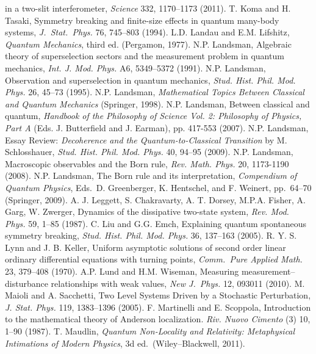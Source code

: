 \documentclass[12pt]{article}
\begin{document}
\begin{thebibliography}{99}
\begin{footnotesize}
in a two-slit interferometer, \emph{Science} 332, 1170--1173 (2011). 
 T. Koma and H. Tasaki, Symmetry breaking and finite-size effects in quantum many-body systems,  \emph{J.\ Stat.\ Phys.}  76, 745--803 (1994).
 L.D. Landau and E.M. Lifshitz, {\it Quantum Mechanics}, third ed. (Pergamon, 1977). 
 N.P. Landsman,
Algebraic
theory of superselection sectors and the measurement problem in
quantum mechanics, \emph{ Int. J. Mod. Phys.}
A6, 5349--5372 (1991). 
  N.P. Landsman,
  Observation and superselection in quantum mechanics, \emph{Stud. Hist. Phil. Mod. Phys.} 26, 45--73 (1995).
 N.P. Landsman, {\it Mathematical Topics Between Classical and Quantum Mechanics} (Springer, 1998).        
 N.P. Landsman,  Between classical and quantum, {\it Handbook of the Philosophy of Science Vol. 2: Philosophy of Physics, Part A} (Eds. J. Butterfield and J. Earman),  pp. 417-553 (2007).
  N.P. Landsman, Essay Review: \emph{Decoherence and the Quantum-to-Classical Transition} by M. Schlosshauer,
\emph{ Stud. Hist. Phil. Mod. Phys.} 40, 94--95 (2009).
   N.P. Landsman, Macroscopic observables and the Born rule, \emph{Rev. Math. Phys.} 20, 1173-1190 (2008).
     N.P. Landsman, The Born rule and its interpretation,   {\it Compendium of Quantum Physics},  Eds.\ D. Greenberger, K. Hentschel, and F. Weinert, pp.\ 64--70 (Springer, 2009).
  A. J. Leggett, S. Chakravarty, A. T. Dorsey, M.P.A. Fisher, A. Garg, W. Zwerger, Dynamics of the dissipative two-state system,
 \emph{Rev. Mod. Phys.}  59, 1--85 (1987). 
  C. Liu and G.G. Emch, Explaining quantum spontaneous symmetry breaking,
  \emph{Stud. Hist. Phil. Mod. Phys.} 36, 137--163  (2005).
    R. Y. S. Lynn and J. B. Keller, Uniform asymptotic solutions of second order linear ordinary differential equations with turning points, \emph{Comm.\ Pure Applied Math.} 23, 379--408 (1970).
    A.P. Lund and H.M. Wiseman, Measuring measurement--disturbance relationships with weak values,  \emph{New J.\ Phys.} 12, 093011
   (2010). 
 M. Maioli and A. Sacchetti, Two Level Systems Driven by a Stochastic Perturbation,
\emph{J. Stat. Phys.}  119, 1383--1396  (2005).
  F. Martinelli and E. Scoppola, Introduction to the mathematical theory of Anderson localization.
 \emph{Riv. Nuovo Cimento} (3) 10, 1--90 (1987).
 	 T. Maudlin, \emph{Quantum Non-Locality and Relativity: Metaphysical Intimations of Modern Physics}, 3d ed.\ (Wiley--Blackwell, 2011).

\end{footnotesize}
\end{thebibliography}
\end{document}
